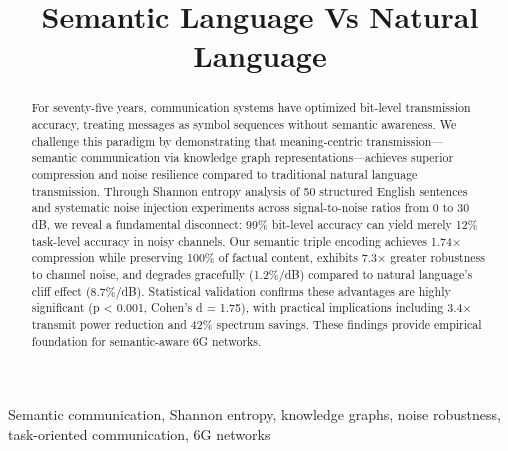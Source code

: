 \documentclass[conference]{IEEEtran}
\begin{document}
\title{Semantic Language Vs Natural Language}

\author{
}

\maketitle

\begin{abstract}
For seventy-five years, communication systems have optimized bit-level 
transmission accuracy, treating messages as symbol sequences without 
semantic awareness. We challenge this paradigm by demonstrating that 
meaning-centric transmission—semantic communication via knowledge graph 
representations—achieves superior compression and noise resilience 
compared to traditional natural language transmission. Through Shannon 
entropy analysis of 50 structured English sentences and systematic noise 
injection experiments across signal-to-noise ratios from 0 to 30 dB, 
we reveal a fundamental disconnect: 99\% bit-level accuracy can yield 
merely 12\% task-level accuracy in noisy channels. Our semantic triple 
encoding achieves 1.74× compression while preserving 100\% of factual 
content, exhibits 7.3× greater robustness to channel noise, and degrades 
gracefully (1.2\%/dB) compared to natural language's cliff effect 
(8.7\%/dB). Statistical validation confirms these advantages are highly 
significant (p < 0.001, Cohen's d = 1.75), with practical implications 
including 3.4× transmit power reduction and 42\% spectrum savings. These 
findings provide empirical foundation for semantic-aware 6G networks.
\end{abstract}

\begin{IEEEkeywords}
Semantic communication, Shannon entropy, knowledge graphs, noise robustness, 
task-oriented communication, 6G networks
\end{IEEEkeywords}
\end{document}
